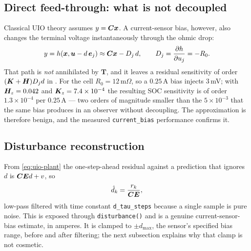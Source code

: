 \subsection{Direct feed-through: what is not decoupled}
\label{sec:uio-feed}
Classical UIO theory assumes $y = \bm{C}\bm{x}$.  A current-sensor bias, however, also changes the
terminal voltage instantaneously through the ohmic drop:
\begin{equation}
y = h(\bm{x}, \bm{u} - d\,\bm{e}_j) \approx \bm{C}\bm{x} - D_j\,d , \qquad D_j = \frac{\partial h}{\partial u_j} = -R_0 .
\label{eq:uio-D}
\end{equation}
That path is \emph{not} annihilated by $\bm{T}$, and it leaves a residual sensitivity of order
$(\bm{K}+\bm{H})D_j d$ in .  For the cell $R_0 = 12$\,m$\Omega$, so a $0.25$\,A bias
injects $3$\,mV; with $\bm{H}_{z}=0.042$ and $\bm{K}_{z}=7.4\times10^{-4}$ the resulting SOC
sensitivity is of order $1.3\times10^{-4}$ per $0.25$\,A --- two orders of magnitude smaller than
the $5\times10^{-3}$ that the same bias produces in an observer without decoupling.  The
approximation is therefore benign, and the measured \texttt{current\_bias} performance confirms
it.

\subsection{Disturbance reconstruction}
From \eqref{eq:uio-plant} the one-step-ahead residual against a prediction that ignores $d$ is
$\bm{C}\bm{E} d + v$, so
\begin{equation}
\hat{d}_k = \frac{r_k}{\bm{C}\bm{E}} ,
\label{eq:uio-drec}
\end{equation}
low-pass filtered with time constant \texttt{d\_tau\_steps} because a single sample is pure noise.
This is exposed through \texttt{disturbance()} and is a genuine current-sensor-bias estimate, in
amperes.  It is clamped to $\pm d_{\max}$, the sensor's specified bias range, before and after
filtering; the next subsection explains why that clamp is not cosmetic.


